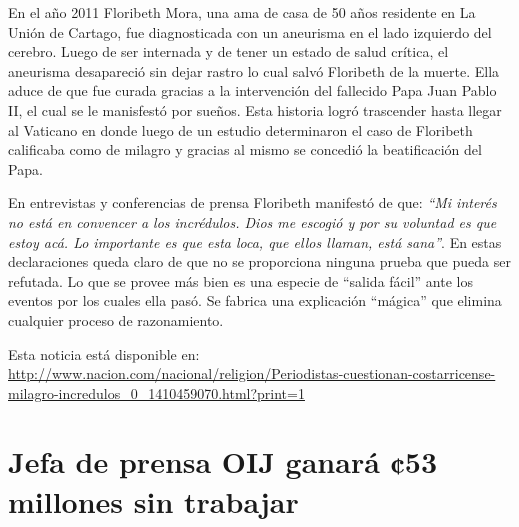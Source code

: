 \documentclass[times]{simauth}
\begin{document}
En el año 2011 Floribeth Mora, una ama de casa de 50 años residente en La Unión de Cartago, fue diagnosticada con un aneurisma en el lado izquierdo del cerebro. Luego de ser internada y de tener un estado de salud crítica, el aneurisma desapareció sin dejar rastro lo cual salvó Floribeth de la muerte. Ella aduce de que fue curada gracias a la intervención del fallecido Papa Juan Pablo II, el cual se le manisfestó por sueños. Esta historia logró trascender hasta llegar al Vaticano en donde luego de un estudio determinaron el caso de Floribeth calificaba como de milagro y gracias al mismo se concedió la beatificación del Papa.

En entrevistas y conferencias de prensa Floribeth manifestó de que: \textit{``Mi interés no está en convencer a los incrédulos. Dios me escogió y por su voluntad es que estoy acá. Lo importante es que esta loca, que ellos llaman, está sana''}. En estas declaraciones queda claro de que no se proporciona ninguna prueba que pueda ser refutada. Lo que se provee más bien es una especie de ``salida fácil'' ante los eventos por los cuales ella pasó. Se fabrica una explicación ``mágica'' que elimina cualquier proceso de razonamiento.

Esta noticia está disponible en:  \href{http://www.nacion.com/nacional/religion/Periodistas-cuestionan-costarricense-milagro-incredulos_0_1410459070.html?print=1}{http://www.nacion.com/nacional/religion/Periodistas-cuestionan-costarricense-milagro-incredulos\_0\_1410459070.html?print=1}

\newpage
\section{Jefa de prensa OIJ ganará ¢53 millones sin trabajar}
\end{document}
